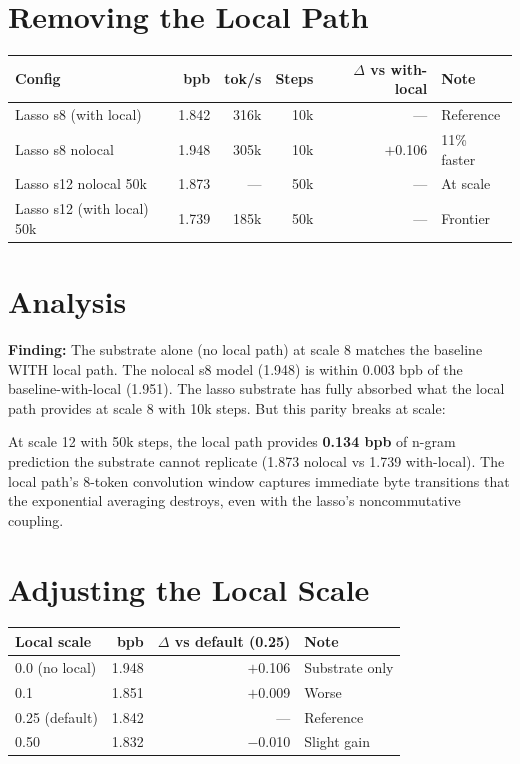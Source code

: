 \documentclass[11pt,a4paper]{report}
\newcommand{\finding}[1]{\textcolor{finding}{\textbf{Finding:}} #1}
\begin{document}
\section{Removing the Local Path}

\begin{center}
\begin{tabular}{lrrrrl}
\toprule
Config & bpb & tok/s & Steps & $\Delta$ vs with-local & Note \\
\midrule
Lasso s8 (with local) & 1.842 & 316k & 10k & --- & Reference \\
Lasso s8 nolocal & 1.948 & 305k & 10k & $+$0.106 & 11\% faster \\
Lasso s12 nolocal 50k & 1.873 & --- & 50k & --- & At scale \\
Lasso s12 (with local) 50k & 1.739 & 185k & 50k & --- & Frontier \\
\bottomrule
\end{tabular}
\end{center}

\section{Analysis}

\finding{The substrate alone (no local path) at scale 8 matches the baseline WITH local path.} The nolocal s8 model (1.948) is within 0.003 bpb of the baseline-with-local (1.951). The lasso substrate has fully absorbed what the local path provides at scale 8 with 10k steps. But this parity breaks at scale:

At scale 12 with 50k steps, the local path provides \textbf{0.134 bpb} of n-gram prediction the substrate cannot replicate (1.873 nolocal vs 1.739 with-local). The local path's 8-token convolution window captures immediate byte transitions that the exponential averaging destroys, even with the lasso's noncommutative coupling.

\section{Adjusting the Local Scale}

\begin{center}
\begin{tabular}{lrrl}
\toprule
Local scale & bpb & $\Delta$ vs default (0.25) & Note \\
\midrule
0.0 (no local) & 1.948 & $+$0.106 & Substrate only \\
0.1 & 1.851 & $+$0.009 & Worse \\
0.25 (default) & 1.842 & --- & Reference \\
0.50 & 1.832 & $-$0.010 & Slight gain \\
\bottomrule
\end{tabular}
\end{center}
\end{document}
